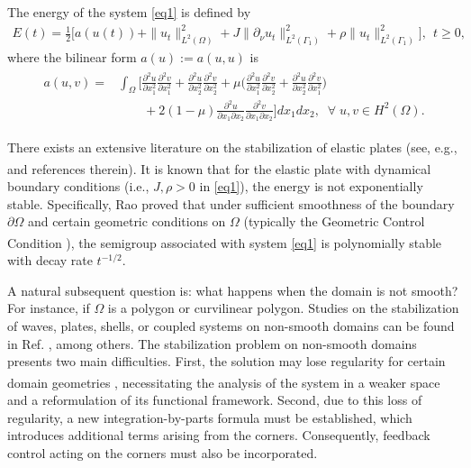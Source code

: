 \documentclass[twoside]{article}
\theoremstyle{noparens}
\theoremstyle{definition}
\numberwithin{equation}{section}
\numberwithin{figure}{section}
\newcommand{\citeup}[1]{\textsuperscript{\cite{#1}}}
\begin{document}
The energy of the system \eqref{eq1}  is defined by
\begin{align}\label{energy}
	E(t)=\frac{1}{2}\Big[a(u(t))+\|u_{t}\|^2_{L^2(\Omega)}
	+J\|\partial_{\nu}u_{t}\|^{2}_{L^2(\Gamma_{1})} +\rho\|u_{t}\|^{2}_{L^2(\Gamma_{1})} \Big],\ \ t\geq 0,
\end{align}
where the bilinear form $a(u):=a(u,u)$ is
\begin{align}\label{bilinear-a}
	\begin{split}
		a(u,v)=&\int_{\Omega}
		\bigg[\frac{\partial^{2}u}{\partial x_{1}^{2}}\frac{\partial^{2}v}{\partial x_{1}^{2}}+\frac{\partial^{2}u}{\partial x_{2}^{2}}\frac{\partial^{2}v}{\partial x_{2}^{2}}
		+\mu\bigg(\frac{\partial^{2}u}{\partial x_{1}^{2}}\frac{\partial^{2}v}{\partial x_{2}^{2}}+\frac{\partial^{2}u}{\partial x_{2}^{2}}\frac{\partial^{2}v}{\partial x_{1}^{2}}\bigg) \\
		& \qquad+2(1-\mu)\frac{\partial^{2}u}{\partial x_{1}\partial x_{2}}\frac{\partial^{2}v}{\partial x_{1}\partial x_{2}}
		\bigg]dx_{1}dx_{2}, \;\; \forall\; u, v\in H^2(\Omega).
	\end{split}
\end{align}
\noindent

There exists an extensive literature on the stabilization of elastic plates (see, e.g., \cite{Robbiano, Ammari1, JE, Littman, Liu-Liu1, LiuYan, Rao1, Rao2, Tucsnak2, Tebou} and references therein). It is known \citeup{LiuYan, Rao2} that for the elastic plate with dynamical boundary conditions (i.e., $J,\rho > 0$ in \eqref{eq1}), the energy is not exponentially stable. Specifically, Rao proved that under sufficient smoothness of the boundary $\partial\Omega$ and certain geometric conditions on $\Omega$ (typically the Geometric Control Condition \citeup{Lebeau}), the semigroup associated with system \eqref{eq1} is polynomially stable with decay rate $t^{-1/2}$.

A natural subsequent question is: what happens when the domain is not smooth? For instance, if $\Omega$ is a  polygon or  curvilinear polygon. Studies on the stabilization of waves, plates, shells, or coupled systems on non-smooth domains can be found in Ref. \cite{ammari, chen1, chen2}, among others. The stabilization problem on non-smooth domains presents two main difficulties. First, the solution may lose regularity for certain domain geometries \citeup{blum, dauge, grisvard}, necessitating the analysis of the system in a weaker space and a reformulation of its functional framework. Second, due to this loss of regularity, a new integration-by-parts formula must be established, which introduces additional terms arising from the corners. Consequently, feedback control acting on the corners must also be incorporated.
\end{document}
